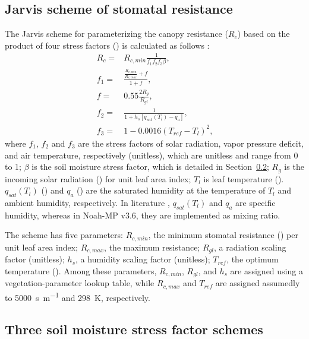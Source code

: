 \documentclass[essd, manuscript]{copernicus}
\let\unit\undefined
\begin{document}
\subsection{Jarvis scheme of stomatal resistance}\label{sec:app:noahmp:jarvis}

The Jarvis scheme for parameterizing the canopy resistance (\(R_{c}\)) based on the product of four stress factors (\unit{s.m^{-1}}) is calculated as follows \citep{chen1996JGRA, sellers1996JCa, jacquemin1990BM, jarvis1976PTRSLB}:
\begin{align}
  R_c =   & R_{c,min} \frac{1}{f_{1} f_{2} f_{3} \beta}
  \text{,} \\
  f_{1} = & \frac{\frac{R_{c,min}}{R_{c,max}}+f}{1+f}
  \text{,} \\
  f =     & 0.55 \frac{2 R_{g}}{R_{gl}}
  \text{,} \\
  f_{2} = & \frac{1}{1+h_s[q_{sat}(T_{l})-q_{a}]}
  \text{,} \\
  f_{3} = & 1- 0.0016 (T_{ref} - T_l)^2
  \text{,}
\end{align}
where \(f_{1}\), \(f_{2}\) and \(f_{3}\) are the stress factors of solar radiation, vapor pressure deficit, and air temperature, respectively (unitless), which are unitless and range from 0 to 1; \(\beta\) is the soil moisture stress factor, which is detailed in Section~\ref{sec:app:noahmp:beta}; \(R_{g}\) is the incoming solar radiation (\unit{W.m^{-2}}) for unit leaf area index; \(T_{l}\) is leaf temperature (\unit{K}). \(q_{sat}(T_l)\) (\unit{kg.kg^{-1}}) and \(q_a\) (\unit{kg.kg^{-1}}) are the saturated humidity at the temperature of \(T_{l}\) and ambient humidity, respectively. In literature \citep{chen1996JGRA, jacquemin1990BM}, \(q_{sat}(T_l)\) and \(q_a\) are specific humidity, whereas in Noah-MP v3.6, they are implemented as mixing ratio.

The scheme has five parameters: \(R_{c,min}\), the minimum stomatal resistance (\unit{s.m^{-1}}) per unit leaf area index; \(R_{c,max}\), the maximum resistance; \(R_{gl}\), a radiation scaling factor (unitless); \(h_{s}\), a humidity scaling factor (unitless); \(T_{ref}\), the optimum temperature (\unit{K}). Among these parameters, \(R_{c,min}\), \(R_{gl}\), and \(h_{s}\) are assigned using a vegetation-parameter lookup table, while \(R_{c,max}\) and \(T_{ref}\) are assigned assumedly to \qty{5000}{s.m^{-1}} and \qty{298}{K}, respectively.

\subsection{Three soil moisture stress factor schemes}\label{sec:app:noahmp:beta}
\end{document}
